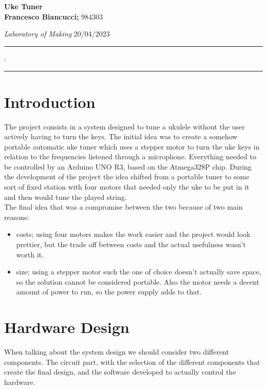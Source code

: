 \documentclass[a4paper,12pt]{article}
\renewenvironment{abstract}
 {\par\noindent\textbf{\abstractname} \ignorespaces:}
 {\par\noindent\medskip}
\begin{document}
\begin{center}
\Large{\textbf{Uke Tuner}}
\vspace{0.4cm}
\normalsize
\\ \textbf{Francesco Biancucci;} 984303 \\
\vspace{0.1cm}

\small{\textit{Laboratory of Making} 20/04/2023}
\medskip
\normalsize
\end{center}
{\color{gray}\hrule}
\vspace{0.4cm}
\begin{abstract}

\end{abstract}
{\color{gray}\hrule}
\medskip
\begin{multicols}{2}
\tableofcontents
\section{Introduction}
The project consists in a system designed to tune a ukulele without the user actively having to turn the keys. The initial idea was to create a somehow portable automatic uke tuner which uses a stepper motor to turn the uke keys in relation to the frequencies listened through a microphone. Everything needed to be controlled by an Arduino UNO R3, based on the Atmega328P chip. During the development of the project the idea shifted from a portable tuner to some sort of fixed station with four motors that needed only the uke to be put in it and then would tune the played string.\\
The final idea that was a compromise between the two because of two main reasons:
\begin{itemize}
    \item costs; using four motors makes the work easier and the project would look prettier, but the trade off between costs and the actual usefulness wasn't worth it.
    \item size; using a stepper motor such the one of choice doesn't actually save space, so the solution cannot be considered portable. Also the motor needs a decent amount of power to run, so the power supply adds to that.
\end{itemize}
\section{Hardware Design}
When talking about the system design we should consider two different components. The circuit part, with the selection of the different components that create the final design, and the software developed to actually control the hardware.

\end{multicols}
\end{document}
